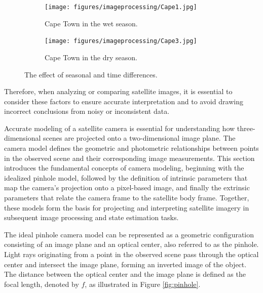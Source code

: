\begin{figure}[H]
    \centering
    \begin{subfigure}[b]{0.48\linewidth}
        \centering
        \texttt{[image: figures/imageprocessing/Cape1.jpg]}
        \caption{Cape Town in the wet season.}
        \label{fig:Time1}
    \end{subfigure}
    \hfill
    \begin{subfigure}[b]{0.48\linewidth}
        \centering
        \texttt{[image: figures/imageprocessing/Cape3.jpg]}
        \caption{Cape Town in the dry season.}
        \label{fig:Time2}
    \end{subfigure}
    \caption{The effect of seasonal and time differences.}
    \label{fig:Time}
\end{figure}

\noindent
Therefore, when analyzing or comparing satellite images, it is essential to consider these factors to ensure accurate interpretation and to 
avoid drawing incorrect conclusions from noisy or inconsistent data.


Accurate modeling of a satellite camera is essential for understanding how three-dimensional scenes are projected onto a two-dimensional image plane. 
The camera model defines the geometric and photometric relationships between points in the observed scene and their corresponding image measurements. 
This section introduces the fundamental concepts of camera modeling, beginning with the idealized pinhole model, followed by the definition of intrinsic parameters that map the camera's projection onto a pixel-based image, and finally the extrinsic parameters that relate the camera frame to the satellite body frame. 
Together, these models form the basis for projecting and interpreting satellite imagery in subsequent image processing and state estimation tasks.


\noindent
The ideal pinhole camera model can be represented as a geometric configuration consisting of an image plane and an optical center, also referred to as the pinhole. 
Light rays originating from a point in the observed scene pass through the optical center and intersect the image plane, forming an inverted image of the object. 
The distance between the optical center and the image plane is defined as the focal length, denoted by $f$, as illustrated in Figure \ref{fig:pinhole}. 

